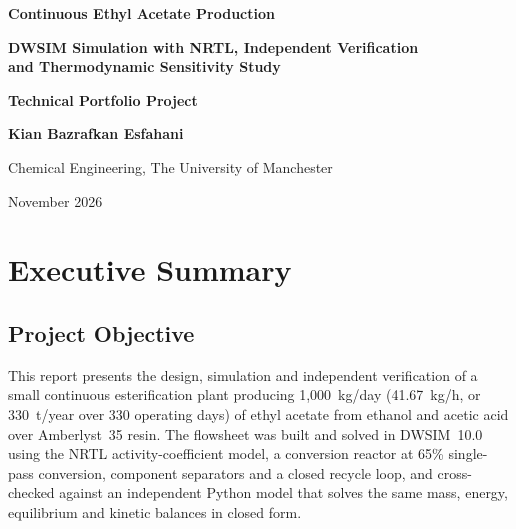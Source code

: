 \documentclass[10pt,a4paper]{article}
\begin{document}
\begin{titlepage}
\thispagestyle{empty}
\centering
\vspace*{2.4cm}

{\LARGE\bfseries Continuous Ethyl Acetate Production\par}
\vspace{0.85cm}
{\large\bfseries DWSIM Simulation with NRTL, Independent Verification\\and Thermodynamic Sensitivity Study\par}
\vspace{3.6cm}

{\large\bfseries Technical Portfolio Project\par}
\vspace{3.6cm}

{\large\bfseries Kian Bazrafkan Esfahani\par}
\vspace{0.45cm}
{\normalsize Chemical Engineering, The University of Manchester\par}
\vspace{0.45cm}
{\normalsize November 2026\par}

\vfill
\end{titlepage}

\setcounter{page}{2}

\section*{Executive Summary}

\subsection*{Project Objective}
This report presents the design, simulation and independent verification of a small continuous esterification plant producing 1,000~kg/day (41.67~kg/h, or 330~t/year over 330 operating days) of ethyl acetate from ethanol and acetic acid over Amberlyst~35 resin. The flowsheet was built and solved in DWSIM~10.0 using the NRTL activity-coefficient model, a conversion reactor at 65\% single-pass conversion, component separators and a closed recycle loop, and cross-checked against an independent Python model that solves the same mass, energy, equilibrium and kinetic balances in closed form.
\end{document}

